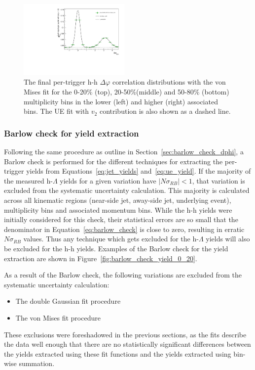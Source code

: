 \begin{figure}[ht]
    \includegraphics[width=0.48\textwidth]{figures/analysis/h_h_dphi_von_50_80_highpt.pdf}
    \caption{The final per-trigger h-h $\Delta\varphi$ correlation distributions with the von Mises fit for the 0-20\% (top), 20-50\%(middle) and 50-80\% (bottom) multiplicity bins in the lower (left) and higher (right) associated \pt bins. The UE fit with $v_{2}$ contribution is also shown as a dashed line.}
    \label{fig:von_fits_h}
\end{figure}

\subsubsection{Barlow check for yield extraction}
\label{sec:barlow_check_yield}

Following the same procedure as outline in Section~\ref{sec:barlow_check_dphi}, a Barlow check is performed for the different techniques for extracting the per-trigger yields from Equations~\ref{eq:jet_yields} and~\ref{eq:ue_yield}. If the majority of the measured h-$\Lambda$ yields for a given variation have $|N\sigma_{RB}| < 1$, that variation is excluded from the systematic uncertainty calculation. This majority is calculated across all kinematic regions (near-side jet, away-side jet, underlying event), multiplicity bins and associated momentum bins. While the h-h yields were initially considered for this check, their statistical errors are so small that the denominator in Equation~\ref{eq:barlow_check} is close to zero, resulting in erratic $N\sigma_{RB}$ values. Thus any technique which gets excluded for the h-$\Lambda$ yields will also be excluded for the h-h yields. Examples of the Barlow check for the yield extraction are shown in Figure~\ref{fig:barlow_check_yield_0_20}. 

As a result of the Barlow check, the following variations are excluded from the systematic uncertainty calculation:
%
\begin{itemize}
    \item The double Gaussian fit procedure
    \item The von Mises fit procedure
\end{itemize}
%
These exclusions were foreshadowed in the previous sections, as the fits describe the data well enough that there are no statistically significant differences between the yields extracted using these fit functions and the yields extracted using bin-wise summation.

